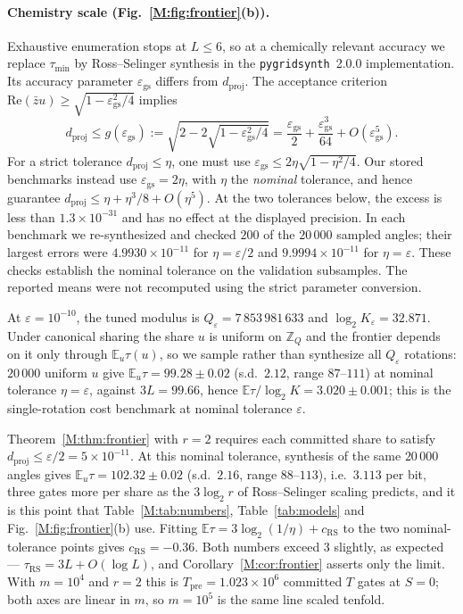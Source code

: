 \documentclass[aps,prx,twocolumn,superscriptaddress,nofootinbib,longbibliography]{revtex4-2}
\theoremstyle{plain}
\theoremstyle{definition}
\theoremstyle{remark}
\newcommand{\dproj}{d_{\mathrm{proj}}}
\newcommand{\Tpre}{T_{\mathrm{pre}}}
\newcommand{\E}{\mathbb{E}}
\newcommand{\Z}{\mathbb{Z}}
\begin{document}
\paragraph{Chemistry scale (Fig.~\ref{M:fig:frontier}(b)).} Exhaustive enumeration stops at $L\le6$, so at a chemically relevant accuracy we replace $\tau_{\min}$ by Ross--Selinger synthesis in the \texttt{pygridsynth}~2.0.0 implementation. Its accuracy parameter $\varepsilon_{\mathrm{gs}}$ differs from $\dproj$. The acceptance criterion $\mathrm{Re}(\bar zu)\ge\sqrt{1-\varepsilon_{\mathrm{gs}}^2/4}$ implies
\[
\dproj\le g(\varepsilon_{\mathrm{gs}}):=\sqrt{2-2\sqrt{1-\varepsilon_{\mathrm{gs}}^2/4}}
=\frac{\varepsilon_{\mathrm{gs}}}{2}+\frac{\varepsilon_{\mathrm{gs}}^3}{64}+O(\varepsilon_{\mathrm{gs}}^5).
\]
For a strict tolerance $\dproj\le\eta$, one must use $\varepsilon_{\mathrm{gs}}\le2\eta\sqrt{1-\eta^2/4}$. Our stored benchmarks instead use $\varepsilon_{\mathrm{gs}}=2\eta$, with $\eta$ the \emph{nominal} tolerance, and hence guarantee $\dproj\le\eta+\eta^3/8+O(\eta^5)$. At the two tolerances below, the excess is less than $1.3\times10^{-31}$ and has no effect at the displayed precision. In each benchmark we re-synthesized and checked $200$ of the $20\,000$ sampled angles; their largest errors were $4.9930\times10^{-11}$ for $\eta=\varepsilon/2$ and $9.9994\times10^{-11}$ for $\eta=\varepsilon$. These checks establish the nominal tolerance on the validation subsamples. The reported means were not recomputed using the strict parameter conversion. 

At $\varepsilon=10^{-10}$, the tuned modulus is $Q_\varepsilon=7\,853\,981\,633$ and $\log_2K_\varepsilon=32.871$. Under canonical sharing the share $u$ is uniform on $\Z_Q$ and the frontier depends on it only through $\E_u\tau(u)$, so we sample rather than synthesize all $Q_\varepsilon$ rotations: $20\,000$ uniform $u$ give $\E_u\tau=99.28\pm0.02$ (s.d.\ $2.12$, range $87$--$111$) at nominal tolerance $\eta=\varepsilon$, against $3L=99.66$, hence $\E\tau/\log_2K=3.020\pm0.001$; this is the single-rotation cost benchmark at nominal tolerance $\varepsilon$. 

Theorem~\ref{M:thm:frontier} with $r=2$ requires each committed share to satisfy $\dproj\le\varepsilon/2=5\times10^{-11}$. At this nominal tolerance, synthesis of the same $20\,000$ angles gives $\E_u\tau=102.32\pm0.02$ (s.d.\ $2.16$, range $88$--$113$), i.e.\ $3.113$ per bit, three gates more per share as the $3\log_2r$ of Ross--Selinger scaling predicts, and it is this point that Table~\ref{M:tab:numbers}, Table~\ref{tab:models} and Fig.~\ref{M:fig:frontier}(b) use. Fitting $\E\tau=3\log_2(1/\eta)+c_{\mathrm{RS}}$ to the two nominal-tolerance points gives $c_{\mathrm{RS}}=-0.36$. Both numbers exceed $3$ slightly, as expected --- $\tau_{\mathrm{RS}}=3L+O(\log L)$, and Corollary~\ref{M:cor:frontier} asserts only the limit. With $m=10^4$ and $r=2$ this is $\Tpre=1.023\times10^6$ committed $T$ gates at $S=0$; both axes are linear in $m$, so $m=10^5$ is the same line scaled tenfold. 
\end{document}

